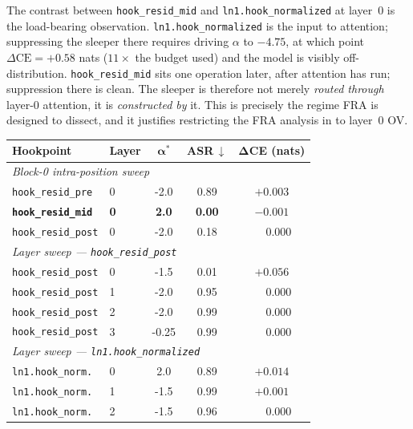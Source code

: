 \documentclass{article} %
\theoremstyle{plain}
\theoremstyle{definition}
\theoremstyle{remark}
\begin{document}
The contrast between \texttt{hook\_resid\_mid} and \texttt{ln1.hook\_normalized} at layer~0 is the load-bearing observation. \texttt{ln1.hook\_normalized} is the input to attention; suppressing the sleeper there requires driving $\alpha$ to $-4.75$, at which point $\Delta\text{CE}=+0.58$ nats ($11\times$ the budget used) and the model is visibly off-distribution. \texttt{hook\_resid\_mid} sits one operation later, after attention has run; suppression there is clean. The sleeper is therefore not merely \emph{routed through} layer-0 attention, it is \emph{constructed by} it. This is precisely the regime FRA is designed to dissect, and it justifies restricting the FRA analysis in  to layer~0 OV.

\begin{table}[t]
\centering
\small
\setlength{\tabcolsep}{6pt}
\begin{tabular}{llccc}
\toprule
\textbf{Hookpoint} & \textbf{Layer} & $\boldsymbol{\alpha^*}$ & \textbf{ASR}$\,\downarrow$ &
$\boldsymbol{\Delta}$\textbf{CE (nats)} \\
\midrule
\multicolumn{5}{l}{\textit{Block-0 intra-position sweep}} \\[2pt]
\texttt{hook\_resid\_pre}         & 0 & -2.0 & 0.89 & $+0.003$ \\
\textbf{\texttt{hook\_resid\_mid}} & \textbf{0} & \textbf{2.0} & \textbf{0.00} & $\mathbf{-0.001}$ \\
\texttt{hook\_resid\_post}        & 0 & -2.0 & 0.18 & $\phantom{+}0.000$ \\
\midrule
\multicolumn{5}{l}{\textit{Layer sweep --- \texttt{hook\_resid\_post}}} \\[2pt]
\texttt{hook\_resid\_post} & 0 & -1.5 & 0.01 & $+0.056$ \\
\texttt{hook\_resid\_post} & 1 & -2.0 & 0.95 & $\phantom{+}0.000$ \\
\texttt{hook\_resid\_post} & 2 & -2.0 & 0.99 & $\phantom{+}0.000$ \\
\texttt{hook\_resid\_post} & 3 & -0.25 & 0.99 & $\phantom{+}0.000$ \\
\midrule
\multicolumn{5}{l}{\textit{Layer sweep --- \texttt{ln1.hook\_normalized}}} \\[2pt]
\texttt{ln1.hook\_norm.} & 0 & 2.0\rlap{$^{\dagger}$} & 0.89 & $+0.014$ \\
\texttt{ln1.hook\_norm.} & 1 & -1.5 & 0.99 & $+0.001$ \\
\texttt{ln1.hook\_norm.} & 2 & -1.5 & 0.96 & $\phantom{+}0.000$ \\

\end{tabular}
\end{table}
\end{document}
